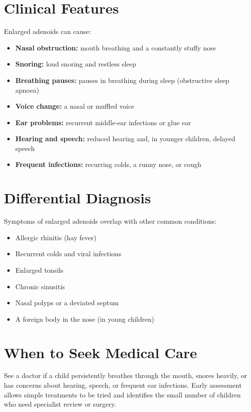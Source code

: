 \section*{Clinical Features}
Enlarged adenoids can cause:

\begin{itemize}
    \item \textbf{Nasal obstruction:} mouth breathing and a constantly stuffy nose
    \item \textbf{Snoring:} loud snoring and restless sleep
    \item \textbf{Breathing pauses:} pauses in breathing during sleep (obstructive sleep apnoea)
    \item \textbf{Voice change:} a nasal or muffled voice
    \item \textbf{Ear problems:} recurrent middle-ear infections or glue ear
    \item \textbf{Hearing and speech:} reduced hearing and, in younger children, delayed speech
    \item \textbf{Frequent infections:} recurring colds, a runny nose, or cough
\end{itemize}

\section*{Differential Diagnosis}
Symptoms of enlarged adenoids overlap with other common conditions:

\begin{itemize}
    \item Allergic rhinitis (hay fever)
    \item Recurrent colds and viral infections
    \item Enlarged tonsils
    \item Chronic sinusitis
    \item Nasal polyps or a deviated septum
    \item A foreign body in the nose (in young children)
\end{itemize}

\section*{When to Seek Medical Care}
See a doctor if a child persistently breathes through the mouth, snores heavily, or has concerns about hearing, speech, or frequent ear infections. Early assessment allows simple treatments to be tried and identifies the small number of children who need specialist review or surgery.


